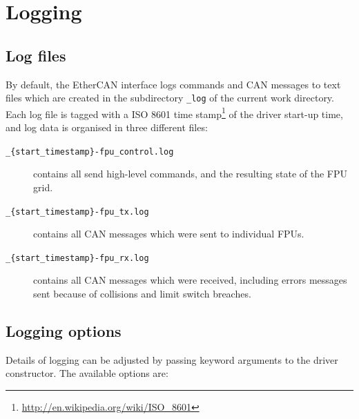 \documentclass[11pt,a4paper]{scrartcl}
\begin{document}
\section{Logging}
\label{sec:logging}
\subsection{Log files}

By default, the EtherCAN interface logs commands and CAN messages to text files
which are created in the subdirectory \texttt{\_log} of the current
work directory. Each log file is tagged with a ISO 8601 time
stamp\footnote{\url{http://en.wikipedia.org/wiki/ISO\_8601}} of the
driver start-up time, and log data is organised in three different
files:

\begin{description}
\item[\texttt{\_\{start\_timestamp\}-fpu\_control.log}] contains all
  send high-level commands, and the resulting state of the FPU grid.
  
\item[\texttt{\_\{start\_timestamp\}-fpu\_tx.log}] contains all CAN messages which were sent to individual FPUs.
\item[\texttt{\_\{start\_timestamp\}-fpu\_rx.log}] contains all CAN
  messages which were received, including errors messages sent because
  of collisions and limit switch breaches.
  
\end{description}


\subsection{Logging options}
Details of logging can be adjusted by passing keyword
arguments to the driver constructor. The available options are:
\end{document}

